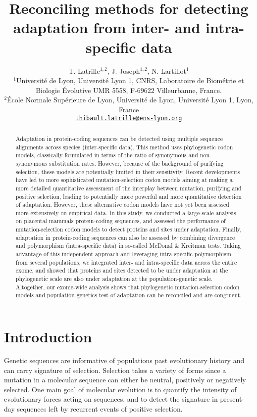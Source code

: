 \documentclass{article}
\title{Reconciling methods for detecting adaptation from inter- and intra-specific data}
\author{
	\large
	T. {Latrille}$^{1,2}$, J. Joseph$^{1,2}$, N. {Lartillot}$^{1}$ \\
	\normalsize
	$^{1}$Université de Lyon, Université Lyon 1, CNRS, Laboratoire de Biométrie et Biologie Évolutive UMR 5558, F-69622 Villeurbanne, France.\\
	$^{2}$École Normale Supérieure de Lyon, Université de Lyon, Université Lyon 1, Lyon, France\\
	\texttt{\href{mailto:thibault.latrille@ens-lyon.org}{thibault.latrille@ens-lyon.org}} \\
}
\begin{document}
\maketitle

\begin{abstract}
	Adaptation in protein-coding sequences can be detected using multiple sequence alignments across species (inter-specific data).
	This method uses phylogenetic codon models, classically formulated in terms of the ratio of synonymous and non-synonymous substitution rates.
	However, because of the background of purifying selection, these models are potentially limited in their sensitivity.
	Recent developments have led to more sophisticated mutation-selection codon models aiming at making a more detailed quantitative assessment of the interplay between mutation, purifying and positive selection, leading to potentially more powerful and more quantitative detection of adaptation.
	However, these alternative codon models have not yet been assessed more extensively on empirical data.
	In this study, we conducted a large-scale analysis on placental mammals protein-coding sequences, and assessed the performance of mutation-selection codon models to detect proteins and sites under adaptation.
	Finally, adaptation in protein-coding sequences can also be assessed by combining divergence and polymorphism (intra-specific data) in so-called McDonal \& Kreitman tests.
	Taking advantage of this independent approach and leveraging intra-specific polymorphism from several populations, we integrated inter- and intra-specific data across the entire exome, and showed that proteins and sites detected to be under adaptation at the phylogenetic scale are also under adaptation at the population-genetic scale.
	Altogether, our exome-wide analysis shows that phylogenetic mutation-selection codon models and population-genetics test of adaptation can be reconciled and are congruent.
\end{abstract}


\section*{Introduction}

Genetic sequences are informative of populations past evolutionary history and can carry signature of selection.
Selection takes a variety of forms since a mutation in a molecular sequence can either be neutral, positively or negatively selected.
One main goal of molecular evolution is to quantify the intensity of evolutionary forces acting on sequences, and to detect the signature in present-day sequences left by recurrent events of positive selection.
\end{document}
